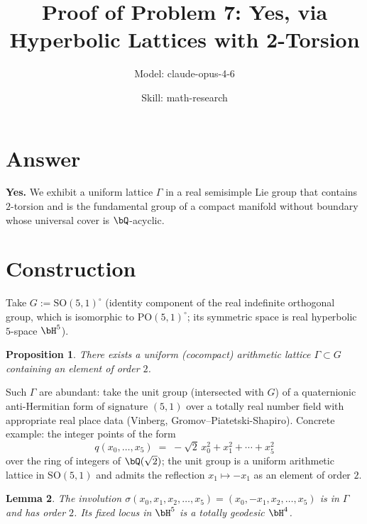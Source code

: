 

\title{Proof of Problem 7: Yes, via Hyperbolic Lattices with 2-Torsion}
\author{Model: claude-opus-4-6 \and Skill: math-research}
\date{}

\newtheorem{theorem}{Theorem}
\newtheorem{lemma}[theorem]{Lemma}
\newtheorem{proposition}[theorem]{Proposition}


\maketitle

\section*{Answer}

\textbf{Yes.} We exhibit a uniform lattice $\Gamma$ in a real semisimple Lie group that contains $2$-torsion and is the fundamental group of a compact manifold without boundary whose universal cover is $\bQ$-acyclic.

\section{Construction}

Take $G := \mathrm{SO}(5,1)^\circ$ (identity component of the real indefinite orthogonal group, which is isomorphic to $\mathrm{PO}(5,1)^\circ$; its symmetric space is real hyperbolic $5$-space $\bH^5$).

\begin{proposition}\label{prop:gamma}
There exists a uniform (cocompact) arithmetic lattice $\Gamma\subset G$ containing an element of order $2$.
\end{proposition}

Such $\Gamma$ are abundant: take the unit group (intersected with $G$) of a quaternionic anti-Hermitian form of signature $(5,1)$ over a totally real number field with appropriate real place data (Vinberg, Gromov--Piatetski-Shapiro). Concrete example: the integer points of the form
\[
   q(x_0,\ldots,x_5) \;=\; -\sqrt{2}\,x_0^2 + x_1^2 + \cdots + x_5^2
\]
over the ring of integers of $\bQ(\sqrt{2})$; the unit group is a uniform arithmetic lattice in $\mathrm{SO}(5,1)$ and admits the reflection $x_1\mapsto -x_1$ as an element of order $2$.

\begin{lemma}\label{lem:order2}
The involution $\sigma(x_0,x_1,x_2,\ldots,x_5) = (x_0,-x_1,x_2,\ldots,x_5)$ is in $\Gamma$ and has order $2$. Its fixed locus in $\bH^5$ is a totally geodesic $\bH^4$.
\end{lemma}

